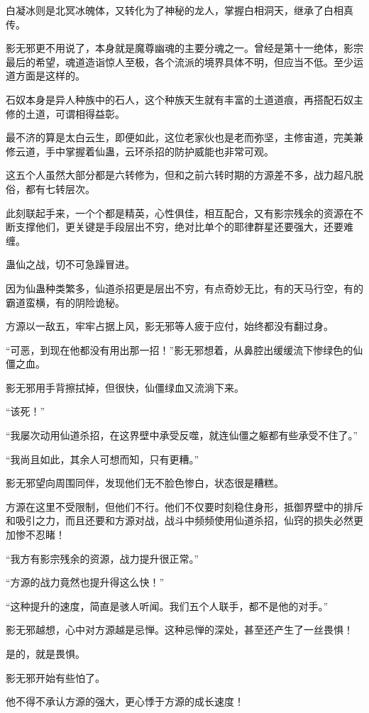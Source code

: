 \begin{this_body}
白凝冰则是北冥冰魄体，又转化为了神秘的龙人，掌握白相洞天，继承了白相真传。

影无邪更不用说了，本身就是魔尊幽魂的主要分魂之一。曾经是第十一绝体，影宗最后的希望，魂道造诣惊人至极，各个流派的境界具体不明，但应当不低。至少运道方面是这样的。

石奴本身是异人种族中的石人，这个种族天生就有丰富的土道道痕，再搭配石奴主修的土道，可谓相得益彰。

最不济的算是太白云生，即便如此，这位老家伙也是老而弥坚，主修宙道，完美兼修云道，手中掌握着仙蛊，云环杀招的防护威能也非常可观。

这五个人虽然大部分都是六转修为，但和之前六转时期的方源差不多，战力超凡脱俗，都有七转层次。

此刻联起手来，一个个都是精英，心性俱佳，相互配合，又有影宗残余的资源在不断支撑他们，更关键是手段层出不穷，绝对比单个的耶律群星还要强大，还要难缠。

蛊仙之战，切不可急躁冒进。

因为仙蛊种类繁多，仙道杀招更是层出不穷，有点奇妙无比，有的天马行空，有的霸道蛮横，有的阴险诡秘。

方源以一敌五，牢牢占据上风，影无邪等人疲于应付，始终都没有翻过身。

“可恶，到现在他都没有用出那一招！”影无邪想着，从鼻腔出缓缓流下惨绿色的仙僵之血。

影无邪用手背擦拭掉，但很快，仙僵绿血又流淌下来。

“该死！”

“我屡次动用仙道杀招，在这界壁中承受反噬，就连仙僵之躯都有些承受不住了。”

“我尚且如此，其余人可想而知，只有更糟。”

影无邪望向周围同伴，发现他们无不脸色惨白，状态很是糟糕。

方源在这里不受限制，但他们不行。他们不仅要时刻稳住身形，抵御界壁中的排斥和吸引之力，而且还要和方源对战，战斗中频频使用仙道杀招，仙窍的损失必然更加惨不忍睹！

“我方有影宗残余的资源，战力提升很正常。”

“方源的战力竟然也提升得这么快！”

“这种提升的速度，简直是骇人听闻。我们五个人联手，都不是他的对手。”

影无邪越想，心中对方源越是忌惮。这种忌惮的深处，甚至还产生了一丝畏惧！

是的，就是畏惧。

影无邪开始有些怕了。

他不得不承认方源的强大，更心悸于方源的成长速度！


\end{this_body}
